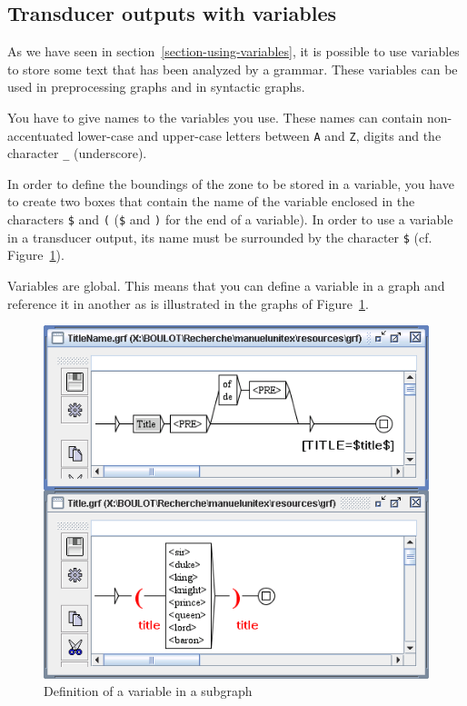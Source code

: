 \subsection{Transducer outputs with variables}
\label{section-variables}
As we have seen in section~\ref{section-using-variables}, it is
possible to use variables to store some text that has been analyzed by a
grammar. These variables can be used in preprocessing graphs and in syntactic
graphs.

\bigskip
\noindent You have to give names to the variables you use. These names can
contain non-accentuated lower-case and upper-case letters between \verb+A+ and \verb+Z+,
digits and the character \verb+_+ (underscore).

\bigskip
\noindent In order to define the boundings of the zone to be stored in a
variable, you have to create two boxes that contain the name of the variable 
enclosed in the characters \verb-$- and \verb-(- (\verb-$- and \verb-)- for the end of a
variable). In order to use a variable in a transducer output, its name must be
surrounded by the character \verb-$- (cf. Figure~\ref{fig-variable-definition}).

\bigskip
\noindent Variables are global. This means that you can define a variable in a graph and
reference it in another as is illustrated in the graphs of
Figure~\ref{fig-variable-definition}.

\begin{figure}[!p]
\begin{center}
\includegraphics[width=12cm]{resources/img/fig6-25.png}
\caption{Definition of a variable in a subgraph\label{fig-variable-definition}}
\end{center}
\end{figure}

